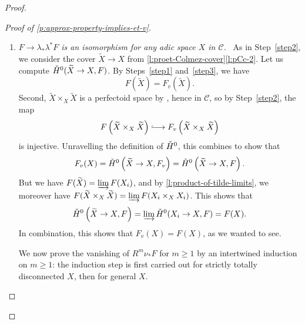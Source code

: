 \documentclass[11pt]{amsart}
\numberwithin{equation}{section}
\theoremstyle{definition}
\theoremstyle{remark}
\newcommand*{\longhookrightarrow}{\lhook\joinrel\longrightarrow}
\newcommand{\wt}{\widetilde}
\newcommand{\cH}{{\ifmmode \check{H}\else{\v{C}ech}\fi}}
\newcommand{\Dmd}{\mathrm{Dmd}}
\newcommand{\supth}[1]{\ensuremath{#1^{\mathrm{th}}}}
\begin{document}
\begin{proof}
\begin{proof}[Proof of \cref{p:approx-property-implies-et-v}]
\begin{enumerate}[label={\emph{Step}~\arabic*:}, ref=\arabic*,wide]
		We are not quite done yet because we do not require $Y_i\to X$ to be a cover in $\mathcal C$. To resolve this, observe that we can endow $\mathcal C$ with a ``smooth'' topology $\mathcal C_{\mathrm{sm}}$ for which we define covers to be the surjective morphisms $U\to V$ that are locally given by a composition $U\to V\times \mathbb B^d\to V$, where the first map is \'etale and the second map is the projection. This indeed defines a site, and this ``smooth'' topology clearly refines the \'etale one. We conclude that $\lambda\colon \Dmd_{K,v}\to \mathcal C$ factors through a morphism of sites $\mu\colon \mathcal C_{\mathrm{sm}}\to \mathcal C$. However, since $X$ is strictly totally disconnected, any cover of $X$ in $\mathcal C_{\mathrm{sm}}$ admits an \'etale refinement. For this reason, we see directly from the explicit definition of the sheafification in terms of the iteratively formed colimit of the $\supth{0}$ \v{C}ech cohomology over all covers  (see \textit{e.g.}~\cite[Tag~00W1]{StacksProject}) that $\mu^{\ast}\mathcal F(X)=\mathcal F(X)$. Since $\cH^0(Y_i\to X,F)\to F_v(X)$ factors through $\cH^0(Y_i\to X,\mu^\ast F)=\mu^{\ast}\mathcal F(X)$, this shows that $\alpha$ lies in the image of $F(X)\to F_v(X)$.
		
\item\label{step4} \emph{$F\to \lambda_{\ast}\lambda^{\ast}F$ is an isomorphism for any adic space $X$ in $\mathcal C$.}~
		As in Step~\ref{step2}, we consider the cover $\wt X\to X$ from \cref{l:proet-Colmez-cover}\eqref{l:pCc-2}. Let us compute $\cH^0(\wt X\to X,F)$. By Steps~\ref{step1} and~\ref{step3}, we have 
		\[ F\left(\wt X\right)=F_v\left(\wt X\right).\]
		Second, $\wt X\times_X\wt X$ is a perfectoid space by , hence in $\mathcal C$, so by Step~\ref{step2}, the map
		\[F\left(\wt X\times_X\wt X\right)\longhookrightarrow F_v\left(\wt X\times_X\wt X\right)\]
		is injective. Unravelling the definition of $\cH^0$, this combines to show that
		\[F_v(X)=\cH^0\left(\wt X\to X,F_v\right)=\cH^0\left(\wt X\to X,F\right).\]
		But we have $F(\wt X)=\varinjlim F(X_i)$, and by \cref{l:product-of-tilde-limits}, we moreover have $F(\wt X\times_X\wt X)=\varinjlim F(X_i\times_XX_i)$. This shows that
		\[
		\cH^0\left(\wt X\to X,F\right)=\varinjlim \cH^0(X_i\to X,F)=F(X).\]
		In combination, this shows that $F_v(X)=F(X)$, as we wanted to see.
		
		\medskip 
		
		We now prove the vanishing of $R^m\nu_{\ast}F$ for $m\geq 1$ by an intertwined induction on $m\geq 1$: the induction step is first carried out for strictly totally disconnected $X$, then for general $X$.
		


\end{enumerate}
\end{proof}
\end{proof}
\end{document}
